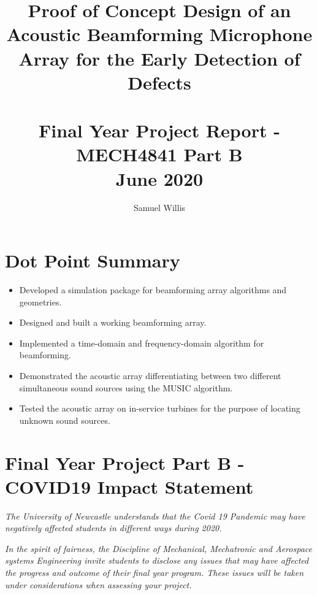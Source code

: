 \documentclass{UoNMCHA}
\numberwithin{equation}{section}
\begin{document}
\singlespacing
\title{Proof of Concept Design of an Acoustic Beamforming Microphone Array for the Early Detection of Defects \\ \ \\
{\small Final Year Project Report - MECH4841 Part B  \\June 2020}}
\author[UoNMCHA]{Samuel Willis}
\address[UoNMCHA]{
Student of Mechanical Engineering,\\
The University of Newcastle, Callaghan, NSW 2308, AUSTRALIA \\
Student Number: 3256767 \\
E-mail: \href{mailto:s.willis@uon.edu.au}{\textsf{s.willis@uon.edu.au}}}
\maketitle
\onecolumn
\newpage
\onehalfspacing
\section*{Dot Point Summary}
    \begin{itemize}
        \item Developed a simulation package for beamforming array algorithms and geometries.
        \item Designed and built a working beamforming array.
        \item Implemented a time-domain and frequency-domain algorithm for beamforming.
        \item Demonstrated the acoustic array differentiating between two different simultaneous sound sources using the MUSIC algorithm.
        \item Tested the acoustic array on in-service turbines for the purpose of locating unknown sound sources.
    \end{itemize}
\newpage
\section*{Final Year Project Part B - COVID19 Impact Statement}
    \emph{The University of Newcastle understands that the Covid 19 Pandemic may have negatively affected students in different ways during 2020.}

    \emph{In the spirit of fairness, the Discipline of Mechanical, Mechatronic and Aerospace systems Engineering invite students to disclose any issues that may have affected the progress and outcome of their final year program. These issues will be taken under considerations when assessing your project.}
    
\end{document}
